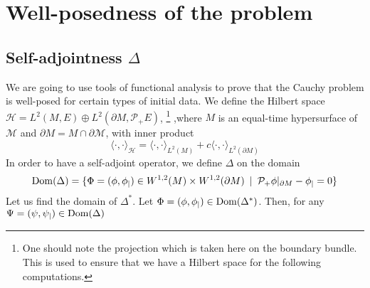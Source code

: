 \section{Well-posedness of the problem}\label{wen-sect-saw}
\subsection{Self-adjointness $\Delta$}
We are going to use tools of functional analysis to prove that the Cauchy problem is well-posed for certain types of initial data.
We define the Hilbert space $\mathcal{H} = L^{2}(M,E)\oplus L^{2}(\partial M, \mathcal{P}_+ E)$,
\footnote{
One should note the projection which is taken here on the boundary bundle.
This is used to ensure that we have a Hilbert space for the following computations.
}
,where $M$ is an equal-time hypersurface of $\mathcal{M}$ and $\partial M = M\cap \partial \mathcal{M}$,
with inner product
\begin{equation}\label{wen-innerpdt}
\langle \cdot, \cdot \rangle _\mathcal{H} = \langle \cdot, \cdot \rangle _{L^2(M)} + c \langle \cdot, \cdot \rangle _{L^2(\partial M)}
\end{equation}
In order to have a self-adjoint operator, we define $\Delta$ on the domain
\begin{equation*}
\mathrm{Dom}( \Delta) = \{ \Phi = (\phi, \phi_|) \in W^{1,2}(M)\times W^{1,2}(
\partial M)\enskip | \enskip \mathcal{P}_+\phi \vert_{\partial M} - \phi_| = 0 \}
\end{equation*}
Let us find the domain of $\Delta^*$.  
Let $\Phi = (\phi, \phi_|) \in \mathrm{Dom}(\Delta^*)$.
Then, for any $ \Psi = (\psi, \psi_|)\in\mathrm{Dom}(\Delta)$
